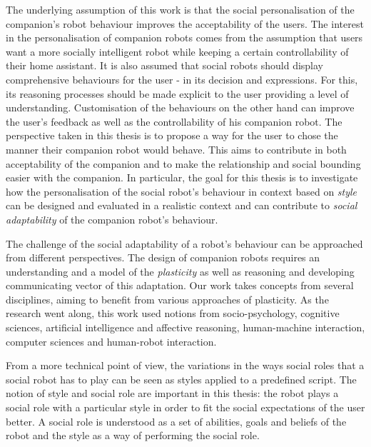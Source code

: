 \documentclass[smallextended]{svjour3}
\begin{document}
The underlying assumption of this work is that the social personalisation of the companion's robot behaviour improves the acceptability of the users.
The interest in the personalisation of companion robots comes from the assumption that users want a more socially intelligent robot while keeping a certain controllability of their home assistant.
It is also assumed that social robots should display comprehensive behaviours for the user - in its decision and expressions.
For this, its reasoning processes should be made explicit to the user providing a level of understanding. 
Customisation of the behaviours on the other hand can improve the user's feedback as well as the controllability of his companion robot.
The perspective taken in this thesis is to propose a way for the user to chose the manner their companion robot would behave. 
This aims to contribute in both acceptability of the companion and to make the relationship and social bounding easier with the companion. 
In particular, the goal for this thesis is to investigate how the personalisation of the social robot's behaviour in context based on \textit{style} can be designed and evaluated in a realistic context and can contribute to \textit{social adaptability} of the companion robot's behaviour.

The challenge of the social adaptability of a robot's behaviour can be approached from different perspectives. 
The design of companion robots requires an understanding and a model of the \textit{plasticity} as well as reasoning and developing communicating vector of this adaptation. 
Our work takes concepts from several disciplines, aiming to benefit from various approaches of plasticity.
As the research went along, this work used notions from socio-psychology, cognitive sciences, artificial intelligence and affective reasoning, human-machine interaction, computer sciences and human-robot interaction.

From a more technical point of view, the variations in the ways social roles that a social robot  has to play can be seen as styles applied to a predefined script.
The notion of style and social role are important in this thesis: the robot plays a social role with a particular style in order to fit  the social expectations of the user better.
A social role is understood as a set of abilities, goals and beliefs of the robot and the style as a way of performing the social role.


\end{document}
